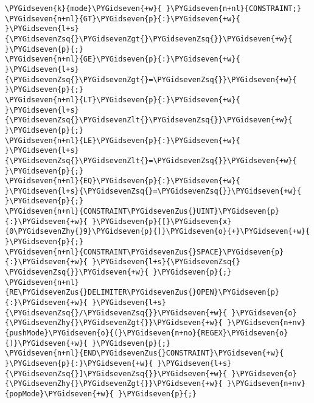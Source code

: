 \begin{Verbatim}[commandchars=\\\{\}]
\PYGidseven{k}{mode}\PYGidseven{+w}{ }\PYGidseven{n+nl}{CONSTRAINT;}
\PYGidseven{n+nl}{GT}\PYGidseven{p}{:}\PYGidseven{+w}{ }\PYGidseven{l+s}{\PYGidsevenZsq{}\PYGidsevenZgt{}\PYGidsevenZsq{}}\PYGidseven{+w}{ }\PYGidseven{p}{;}
\PYGidseven{n+nl}{GE}\PYGidseven{p}{:}\PYGidseven{+w}{ }\PYGidseven{l+s}{\PYGidsevenZsq{}\PYGidsevenZgt{}=\PYGidsevenZsq{}}\PYGidseven{+w}{ }\PYGidseven{p}{;}
\PYGidseven{n+nl}{LT}\PYGidseven{p}{:}\PYGidseven{+w}{ }\PYGidseven{l+s}{\PYGidsevenZsq{}\PYGidsevenZlt{}\PYGidsevenZsq{}}\PYGidseven{+w}{ }\PYGidseven{p}{;}
\PYGidseven{n+nl}{LE}\PYGidseven{p}{:}\PYGidseven{+w}{ }\PYGidseven{l+s}{\PYGidsevenZsq{}\PYGidsevenZlt{}=\PYGidsevenZsq{}}\PYGidseven{+w}{ }\PYGidseven{p}{;}
\PYGidseven{n+nl}{EQ}\PYGidseven{p}{:}\PYGidseven{+w}{ }\PYGidseven{l+s}{\PYGidsevenZsq{}=\PYGidsevenZsq{}}\PYGidseven{+w}{ }\PYGidseven{p}{;}
\PYGidseven{n+nl}{CONSTRAINT\PYGidsevenZus{}UINT}\PYGidseven{p}{:}\PYGidseven{+w}{ }\PYGidseven{p}{[}\PYGidseven{x}{0\PYGidsevenZhy{}9}\PYGidseven{p}{]}\PYGidseven{o}{+}\PYGidseven{+w}{ }\PYGidseven{p}{;}
\PYGidseven{n+nl}{CONSTRAINT\PYGidsevenZus{}SPACE}\PYGidseven{p}{:}\PYGidseven{+w}{ }\PYGidseven{l+s}{\PYGidsevenZsq{} \PYGidsevenZsq{}}\PYGidseven{+w}{ }\PYGidseven{p}{;}
\PYGidseven{n+nl}{RE\PYGidsevenZus{}DELIMITER\PYGidsevenZus{}OPEN}\PYGidseven{p}{:}\PYGidseven{+w}{ }\PYGidseven{l+s}{\PYGidsevenZsq{}/\PYGidsevenZsq{}}\PYGidseven{+w}{ }\PYGidseven{o}{\PYGidsevenZhy{}\PYGidsevenZgt{}}\PYGidseven{+w}{ }\PYGidseven{n+nv}{pushMode}\PYGidseven{o}{(}\PYGidseven{n+no}{REGEX}\PYGidseven{o}{)}\PYGidseven{+w}{ }\PYGidseven{p}{;}
\PYGidseven{n+nl}{END\PYGidsevenZus{}CONSTRAINT}\PYGidseven{+w}{   }\PYGidseven{p}{:}\PYGidseven{+w}{ }\PYGidseven{l+s}{\PYGidsevenZsq{}]\PYGidsevenZsq{}}\PYGidseven{+w}{ }\PYGidseven{o}{\PYGidsevenZhy{}\PYGidsevenZgt{}}\PYGidseven{+w}{ }\PYGidseven{n+nv}{popMode}\PYGidseven{+w}{ }\PYGidseven{p}{;}
\end{Verbatim}
